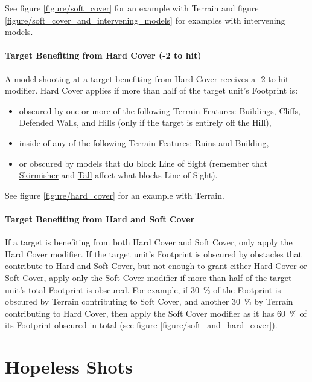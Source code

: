 See figure \ref{figure/soft_cover} for an example with Terrain and figure \ref{figure/soft_cover_and_intervening_models} for examples with intervening models.

\paragraph{Target Benefiting from Hard Cover (-2 to hit)}

A model shooting at a target benefiting from Hard Cover receives a -2 to-hit modifier. Hard Cover applies if more than half of the target unit's Footprint is:
\begin{itemize}[label={-}]
\item obscured by one or more of the following Terrain Features: Buildings, Cliffs, Defended Walls, and Hills (only if the target is entirely off the Hill),
\item inside of any of the following Terrain Features: Ruins and Building,
\item or obscured by models that \textbf{do} block Line of Sight (remember that \hyperref[skirmisher]{Skirmisher} and \hyperref[tall]{Tall} affect what blocks Line of Sight).
\end{itemize}

See figure \ref{figure/hard_cover} for an example with Terrain.
 
\paragraph{Target Benefiting from Hard and Soft Cover}

If a target is benefiting from both Hard Cover and Soft Cover, only apply the Hard Cover modifier. If the target unit's Footprint is obscured by obstacles that contribute to Hard and Soft Cover, but not enough to grant either Hard Cover or Soft Cover, apply only the Soft Cover modifier if more than half of the target unit's total Footprint is obscured. For example, if \SI{30}{\percent} of the Footprint is obscured by Terrain contributing to Soft Cover, and another \SI{30}{\percent} by Terrain contributing to Hard Cover, then apply the Soft Cover modifier as it has \SI{60}{\percent} of its Footprint obscured in total (see figure \ref{figure/soft_and_hard_cover}).

\section{Hopeless Shots}
\label{hopeless_shots}

